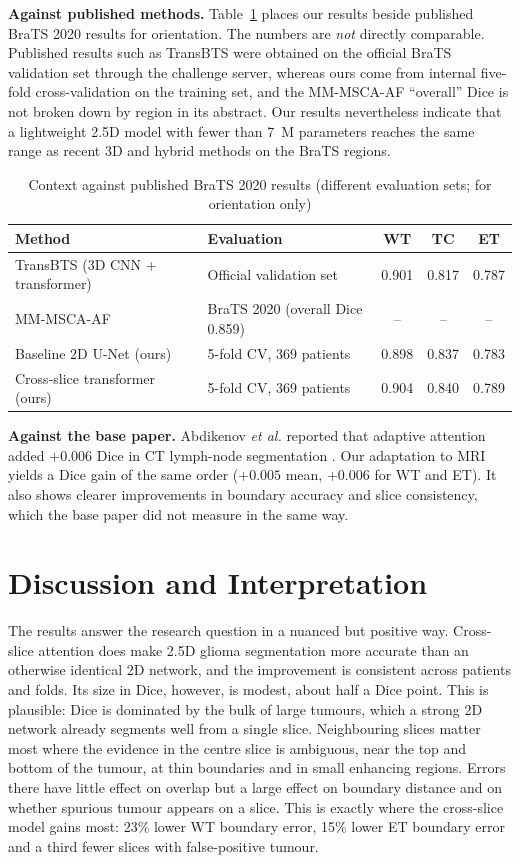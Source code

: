 \textbf{Against published methods.} Table~\ref{tab:sota} places our results beside published BraTS 2020 results for orientation. The numbers are \emph{not} directly comparable. Published results such as TransBTS were obtained on the official BraTS validation set through the challenge server, whereas ours come from internal five-fold cross-validation on the training set, and the MM-MSCA-AF ``overall'' Dice is not broken down by region in its abstract. Our results nevertheless indicate that a lightweight 2.5D model with fewer than 7~M parameters reaches the same range as recent 3D and hybrid methods on the BraTS regions.

\begin{table}[htbp]\centering\small
\caption{Context against published BraTS 2020 results (different evaluation sets; for orientation only)}\label{tab:sota}
\begin{tabular}{p{4.6cm}p{4.4cm}ccc}\toprule
\textbf{Method} & \textbf{Evaluation} & \textbf{WT} & \textbf{TC} & \textbf{ET}\\\midrule
TransBTS (3D CNN + transformer) \cite{wang2021transbts} & Official validation set & 0.901 & 0.817 & 0.787\\
MM-MSCA-AF \cite{aslam2025} & BraTS 2020 (overall Dice 0.859) & -- & -- & --\\
Baseline 2D U-Net (ours) & 5-fold CV, 369 patients & 0.898 & 0.837 & 0.783\\
Cross-slice transformer (ours) & 5-fold CV, 369 patients & 0.904 & 0.840 & 0.789\\\bottomrule
\end{tabular}
\end{table}

\textbf{Against the base paper.} Abdikenov \emph{et al.} reported that adaptive attention added $+0.006$ Dice in CT lymph-node segmentation \cite{abdikenov2026}. Our adaptation to MRI yields a Dice gain of the same order ($+0.005$ mean, $+0.006$ for WT and ET). It also shows clearer improvements in boundary accuracy and slice consistency, which the base paper did not measure in the same way.

\section{Discussion and Interpretation}
The results answer the research question in a nuanced but positive way. Cross-slice attention does make 2.5D glioma segmentation more accurate than an otherwise identical 2D network, and the improvement is consistent across patients and folds. Its size in Dice, however, is modest, about half a Dice point. This is plausible: Dice is dominated by the bulk of large tumours, which a strong 2D network already segments well from a single slice. Neighbouring slices matter most where the evidence in the centre slice is ambiguous, near the top and bottom of the tumour, at thin boundaries and in small enhancing regions. Errors there have little effect on overlap but a large effect on boundary distance and on whether spurious tumour appears on a slice. This is exactly where the cross-slice model gains most: 23\% lower WT boundary error, 15\% lower ET boundary error and a third fewer slices with false-positive tumour.

